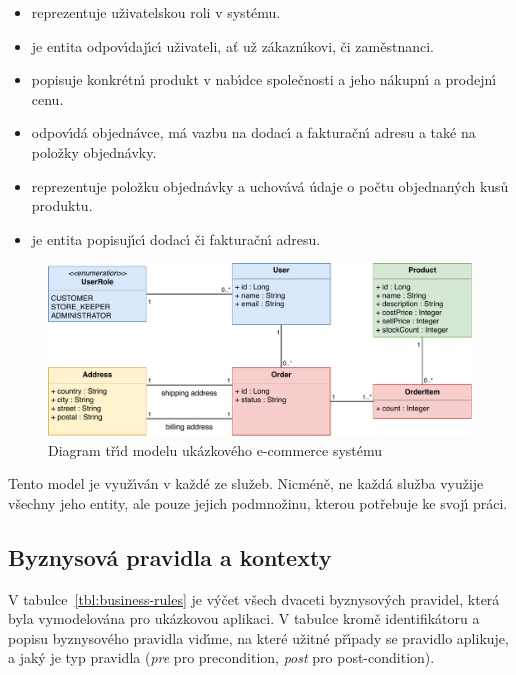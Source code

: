 \begin{itemize}
    \item \textbf{} reprezentuje uživatelskou roli v systému.
    \item \textbf{} je entita odpov\'{\i}daj\'{\i}c\'{\i} uživateli, ať už zákazn\'{\i}kovi, či zaměstnanci.
    \item \textbf{} popisuje konkrétn\'{\i} produkt v nab\'{\i}dce společnosti a jeho nákupn\'{\i} a prodejn\'{\i} cenu.
    \item \textbf{} odpov\'{\i}dá objednávce, má vazbu na dodac\'{\i} a fakturačn\'{\i} adresu a také na položky objednávky.
    \item \textbf{} reprezentuje položku objednávky a uchovává údaje o počtu objednan\'ych kusů produktu.
    \item \textbf{} je entita popisuj\'{\i}c\'{\i} dodac\'{\i} či fakturačn\'{\i} adresu.
\end{itemize}

\begin{figure}[ht]
    \centering
    \includegraphics[keepaspectratio=true, width=0.9\linewidth]{figures/example-model.pdf}
    \caption{Diagram tř\'{\i}d modelu ukázkového e-commerce systému}
    \label{fig:example-model}
\end{figure}

Tento model je využ\'{\i}ván v každé ze služeb. Nicméně, ne každá služba využije všechny jeho entity,
ale pouze jejich podmnožinu, kterou potřebuje ke svoj\'{\i} práci.

\subsection{Byznysová pravidla a kontexty}

V tabulce~\ref{tbl:business-rules} je v\'yčet všech dvaceti byznysov\'ych pravidel, která byla
vymodelována pro ukázkovou aplikaci. V tabulce kromě identifikátoru a popisu byznysového pravidla
vid\'{\i}me, na které užitné př\'{\i}pady se pravidlo aplikuje, a jak\'y je typ pravidla
(\textit{pre} pro precondition, \textit{post} pro post-condition).

